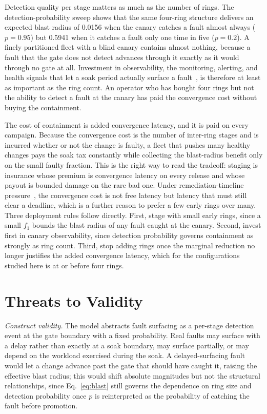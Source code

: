 \documentclass[journal]{IEEEtran}
\begin{document}
Detection quality per stage matters as much as the number of rings. The detection-probability sweep
shows that the same four-ring structure delivers an expected blast radius of 0.0156 when the canary
catches a fault almost always ($p = 0.95$) but 0.5941 when it catches a fault only one time in five
($p = 0.2$). A finely partitioned fleet with a blind canary contains almost nothing, because a fault
that the gate does not detect advances through it exactly as it would through no gate at all.
Investment in observability, the monitoring, alerting, and health signals that let a soak period
actually surface a fault~\cite{nist80137,basiri2016chaos}, is therefore at least as important as the
ring count. An operator who has bought four rings but not the ability to detect a fault at the canary
has paid the convergence cost without buying the containment.

The cost of containment is added convergence latency, and it is paid on every campaign. Because the
convergence cost is the number of inter-ring stages and is incurred whether or not the change is
faulty, a fleet that pushes many healthy changes pays the soak tax constantly while collecting the
blast-radius benefit only on the small faulty fraction. This is the right way to read the tradeoff:
staging is insurance whose premium is convergence latency on every release and whose payout is
bounded damage on the rare bad one. Under remediation-timeline pressure~\cite{cisabod2201}, the
convergence cost is not free latency but latency that must still clear a deadline, which is a further
reason to prefer a few early rings over many. Three deployment rules follow directly. First, stage
with small early rings, since a small $f_1$ bounds the blast radius of any fault caught at the
canary. Second, invest first in canary observability, since detection probability governs containment
as strongly as ring count. Third, stop adding rings once the marginal reduction no longer justifies
the added convergence latency, which for the configurations studied here is at or before four rings.

\section{Threats to Validity}
\emph{Construct validity.} The model abstracts fault surfacing as a per-stage detection event at the
gate boundary with a fixed probability. Real faults may surface with a delay rather than exactly at a
soak boundary, may surface partially, or may depend on the workload exercised during the soak. A
delayed-surfacing fault would let a change advance past the gate that should have caught it,
raising the effective blast radius; this would shift absolute magnitudes but not the structural
relationships, since Eq.~\eqref{eq:blast} still governs the dependence on ring size and detection
probability once $p$ is reinterpreted as the probability of catching the fault before promotion.
\end{document}
